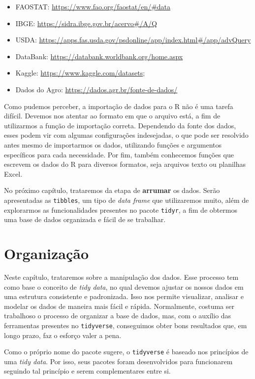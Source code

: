 \documentclass[
  brazilian,
]{book}
\begin{document}
\begin{itemize}
\item
  FAOSTAT: \url{https://www.fao.org/faostat/en/\#data}
\item
  IBGE: \url{https://sidra.ibge.gov.br/acervo\#/A/Q}
\item
  USDA: \url{https://apps.fas.usda.gov/psdonline/app/index.html\#/app/advQuery}
\item
  DataBank: \url{https://databank.worldbank.org/home.aspx}
\item
  Kaggle: \url{https://www.kaggle.com/datasets};
\item
  Dados do Agro: \url{https://dados.agr.br/fonte-de-dados/}
\end{itemize}

Como pudemos perceber, a importação de dados para o R não é uma tarefa difícil. Devemos nos atentar ao formato em que o arquivo está, a fim de utilizarmos a função de importação correta. Dependendo da fonte dos dados, esses podem vir com algumas configurações indesejadas, o que pode ser resolvido antes mesmo de importarmos os dados, utilizando funções e argumentos específicos para cada necessidade. Por fim, também conhecemos funções que escrevem os dados do R para diversos formatos, seja arquivos texto ou planilhas Excel.

No próximo capítulo, trataremos da etapa de \textbf{arrumar} os dados. Serão apresentadas as \texttt{tibbles}, um tipo de \emph{data frame} que utilizaremos muito, além de explorarmos as funcionalidades presentes no pacote \texttt{tidyr}, a fim de obtermos uma base de dados organizada e fácil de se trabalhar.

\hypertarget{org}{%
\chapter{Organização}\label{org}}

Neste capítulo, trataremos sobre a manipulação dos dados. Esse processo tem como base o conceito de \emph{tidy data}, no qual devemos ajustar os nossos dados em uma estrutura consistente e padronizada. Isso nos permite visualizar, analisar e modelar os dados de maneira mais fácil e rápida. Normalmente, costuma ser trabalhoso o processo de organizar a base de dados, mas, com o auxílio das ferramentas presentes no \texttt{tidyverse}, conseguimos obter bons resultados que, em longo prazo, faz o esforço valer a pena.

Como o próprio nome do pacote sugere, o \texttt{tidyverse} é baseado nos princípios de uma \emph{tidy data}. Por isso, seus pacotes foram desenvolvidos para funcionarem seguindo tal princípio e serem complementares entre si.
\end{document}
